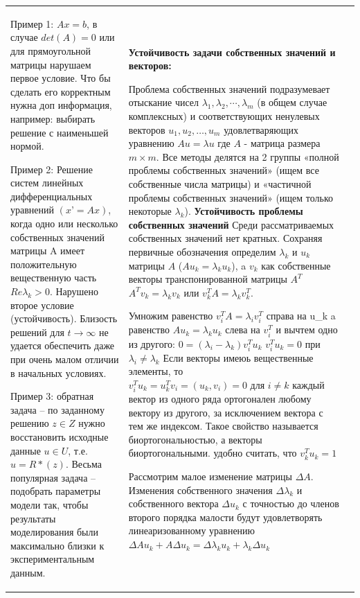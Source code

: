 \documentclass[a4paper,2pt]{article}
\begin{document}
\begin{tabular}{|p{}|p{}|p{}|}
Пример 1: \(Ax=b\), в случае \(det(A) = 0\) или для прямоугольной матрицы нарушаем первое условие. Что бы сделать его корректным нужна доп информация, например: выбирать решение с наименьшей нормой.

Пример 2: Решение систем линейных дифференциальных уравнений \((x’=Ax)\), когда одно или несколько собственных значений матрицы A имеет положительную вещественную часть \(Re\lambda_k >0\). Нарушено второе условие (устойчивость). Близость решений для \(t \rightarrow \infty\) не удается обеспечить даже при очень малом отличии в начальных условиях.

Пример 3: обратная задача – по заданному решению \(z \in Z\)  нужно восстановить исходные данные \(u \in U\), т.е. \(u=R*(z)\). Весьма популярная задача – подобрать параметры модели так, чтобы результаты моделирования были максимально близки к экспериментальным данным.

&
\textbf{Устойчивость задачи собственных значений и векторов:}

Проблема собственных значений подразумевает отыскание чисел \(\lambda_1, \lambda_2, \cdots, \lambda_m \) (в общем случае комплексных) и соответствующих ненулевых векторов \(u_1, u_2, \ldots, u_m\) удовлетваряющих уравнению \(Au=\lambda u\) где  \(A\) - матрица размера  \(m \times m \). Все методы делятся на 2 группы «полной проблемы собственных значений» (ищем все собственные числа матрицы) и «частичной проблемы собственных значений» (ищем только некоторые \( \lambda_k \)).
\textbf{Устойчивость проблемы собственных значений}
Среди рассматриваемых собственных значений нет кратных. Сохраняя первичные обозначения определим \( \lambda_k \) и \(u_k\) матрицы \(A\)
(\( A u_k= \lambda_k u_k \)), a \(v_k\) как собственные векторы транспонированной матрицы \(A^T\)
\(A^T v_k= \lambda_k v_k \) или \(v_k^T A = \lambda_k v_k^T\).

Умножим равенство \(v_i^T A = \lambda_i v_i^T\) справа на u_k a равенство \(Au_k = \lambda_k u_k\) слева на \(v_i^T\) и вычтем одно из другого:
\( 0 = (\lambda_i - \lambda_k)v_i^T u_k \)  \(v_i^T u_k = 0\) при \(\lambda_i \neq \lambda_k\)
Если векторы имеюь вещественные элементы, то \(v_i^T u_k = u_k^T v_i = (u_k,v_i) =0 \text{ для } i \neq k\)
каждый вектор из одного ряда ортогонален любому вектору из другого, за исключением вектора с тем же индексом. Такое свойство называется биортогональностью, а векторы биортогональными.
удобно считать, что \( v_k^T u_k = 1 \)

Рассмотрим малое изменение матрицы \(\Delta A\). Изменения собственного значения \(\Delta\lambda_k\) и собственного вектора \(\Delta u_k\) с точностью до членов второго порядка малости будут удовлетворять линеаризованному уравнению
\(\Delta Au_k + A\Delta u_k = \Delta\lambda_k u_k + \lambda_k\Delta u_k\)


\end{tabular}
\end{document}
